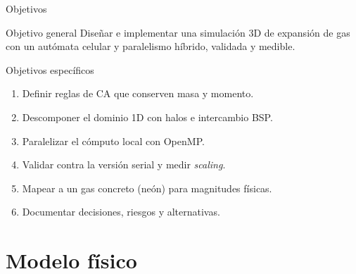 \documentclass[aspectratio=169]{beamer}
\begin{document}
\begin{frame}{Objetivos}
  \begin{block}{Objetivo general}
    Diseñar e implementar una simulación 3D de expansión de gas con un
    autómata celular y paralelismo híbrido, validada y medible.
  \end{block}
  \begin{block}{Objetivos específicos}
    \footnotesize
    \begin{enumerate}
      \item Definir reglas de CA que conserven masa y momento.
      \item Descomponer el dominio 1D con halos e intercambio BSP.
      \item Paralelizar el cómputo local con OpenMP.
      \item Validar contra la versión serial y medir \emph{scaling}.
      \item Mapear a un gas concreto (neón) para magnitudes físicas.
      \item Documentar decisiones, riesgos y alternativas.
    \end{enumerate}
  \end{block}
\end{frame}

\section{Modelo físico}
\end{document}
